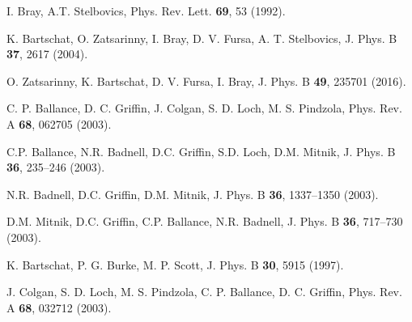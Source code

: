 \begin{thebibliography}{9}
\begin{comment}
\bibitem{Schulz01} 
F. Schulz, J. Shchuchinzky, 
Nucl. Instrum. Methods Phys. Res., B \textbf{12},  90-94 (1985).

\bibitem{Chilton} 
A.B. Chilton, J.N. Cooper, J.C. Harris, 
Phys. Rev. \textbf{93}, 413-418  (1954).

\bibitem{Rajatora} 
M. Rajatora, K. Vakevainen, T. Ahlgre, E. Rauhala, J. Raisanen, K. Rakennus, 
Nucl. Instrum. Methods Phys. Res., B \textbf{119}, 457-462 (1996).


\end{comment}


I. Bray, A.T. Stelbovics, 
Phys. Rev. Lett. \textbf{69}, 53 (1992).

K. Bartschat, O. Zatsarinny, I. Bray, D. V. Fursa, A. T. Stelbovics,
J. Phys. B \textbf{37}, 2617 (2004).

O. Zatsarinny, K. Bartschat, D. V. Fursa, I. Bray,
J. Phys. B \textbf{49}, 235701 (2016).

C. P. Ballance, D. C. Griffin, J. Colgan, S. D. Loch, M. S. Pindzola,
Phys. Rev. A \textbf{68}, 062705 (2003).

C.P. Ballance, N.R. Badnell, D.C. Griffin, S.D. Loch, D.M. Mitnik, 
J. Phys. B \textbf{36}, 235--246 (2003).

N.R. Badnell, D.C. Griffin, D.M. Mitnik, 
J. Phys. B \textbf{36}, 1337--1350 (2003).

D.M. Mitnik, D.C. Griffin, C.P. Ballance, N.R. Badnell, 
J. Phys. B \textbf{36}, 717--730 (2003).

K. Bartschat, P. G. Burke, M. P. Scott, 
J. Phys. B \textbf{30}, 5915 (1997).

J. Colgan, S. D. Loch, M. S. Pindzola, C. P. Ballance, D. C. Griffin, 
Phys. Rev. A \textbf{68}, 032712 (2003).


\end{thebibliography}
